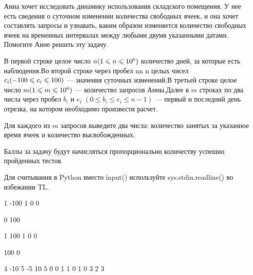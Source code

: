 
Анна хочет исследовать динамику использования складского помещения. У нее есть сведения о суточном изменении количества свободных ячеек, и она хочет составлять запросы и узнавать, каким образом изменяется количество свободных ячеек на временных интервалах между любыми двумя указанными датами. Помогите Анне решить эту задачу.

В первой строке целое число $n\space (1\leq n \leq 10^6)$  количество дней, за которые есть 
наблюдения.Во второй строке через пробел nn n  целых чисел $c_i\space (-100\leq c_i \leq 100)$  — 
значения суточных изменений.В третьей строке целое число $m\space (1\leq m \leq 10^6)$  — 
количество запросов Анны.Далее в $m$  строках по два числа через пробел $b_i$  и $e_i$  
$(0\leq b_i \leq e_i \leq n-1)$  — первый и последний день отрезка, на котором необходимо 
произвести расчет.

\outputfmtSection
Для каждого из $m$  запросов выведите два числа: количество занятых за указанное время ячеек и количество высвобожденных.

\markSection

Баллы за задачу будут начисляться пропорционально количеству успешно пройденных тестов.

\explanationSection

Для считывания в Python вместо input() используйте sys.stdin.readline() во избежании TL.


\begin{myverbbox}[\small]{\vinput}
    1
-100
1
0 0
\end{myverbbox}

\begin{myverbbox}[\small]{\voutput}
    0 100
\end{myverbbox}


\begin{myverbbox}[\small]{\vinput}
    1
    100
    1
    0 0
\end{myverbbox}

\begin{myverbbox}[\small]{\voutput}
    100 0
\end{myverbbox}


\begin{myverbbox}[\small]{\vinput}
    4
    -10 5 -5 10
    5
    0 0
    1 1
    0 1
    0 3
    2 3
\end{myverbbox}

